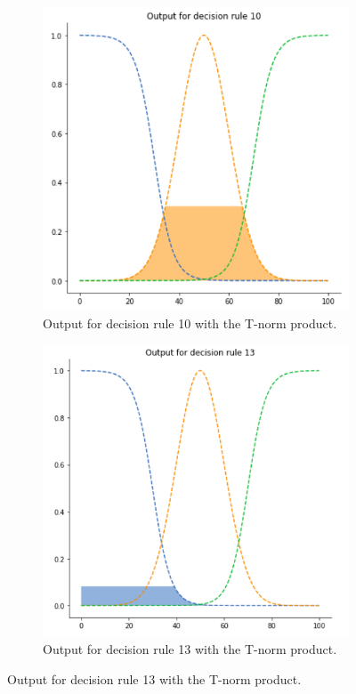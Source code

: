 \documentclass[conference]{IEEEtran}
\begin{document}
\begin{figure}[ht]
\begin{subfigure}{.5\textwidth}
  \centering
  \includegraphics[width=.8\linewidth]{figures/second/prod1.png}  
  \caption{Output for decision rule 10 with the T-norm product.}
  \label{fig:2prod1}
\end{subfigure}
\begin{subfigure}{.5\textwidth}
  \centering
  \includegraphics[width=.8\linewidth]{figures/second/prod2.png}  
  \caption{Output for decision rule 13 with the T-norm product.}
  \label{fig:2prod2}
\end{subfigure}

\end{figure}
\end{document}
